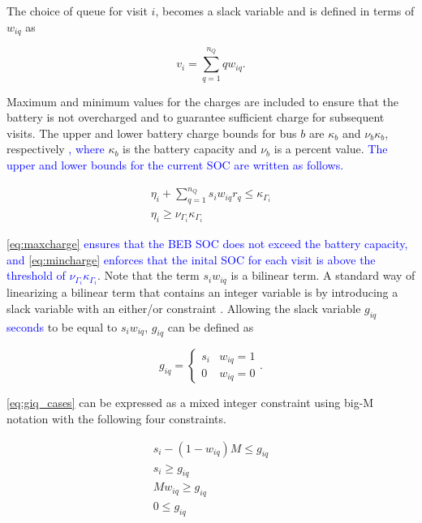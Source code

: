 \documentclass[utf8]{FrontiersinHarvard}
\let\cite\citep                                       %
\begin{document}
The choice of queue for visit \(i\), becomes a slack variable and is defined in terms of \(w_{iq}\) as

\begin{equation}
    v_i = \sum_{q=1}^{n_Q} qw_{iq}.
\end{equation}

Maximum and minimum values for the charges are included to ensure that the battery is not overcharged and to guarantee
sufficient charge for subsequent visits. The upper and lower battery charge bounds for bus \(b\) are \(\kappa_b\) and \(\nu_b \kappa_b\),
respectively \textcolor{blue}{, where} \(\kappa_b\) is the battery capacity and \(\nu_b\) is a percent value. \textcolor{blue}{The upper and lower bounds for the current SOC are written as follows.}

\begin{subequations}
    \label{subeq:pre_min_max}
\begin{align}
    \eta_i + \sum_{q=1}^{n_Q} s_i w_{iq} r_q \leq \kappa_{\Gamma_i} \label{eq:maxcharge}\\
    \eta_i \geq \nu_{\Gamma_i} \kappa_{\Gamma_i} \label{eq:mincharge}
\end{align}
\end{subequations}

\textcolor{blue}{{\autoref{eq:maxcharge}} ensures that the BEB SOC does not exceed the battery capacity, and {\autoref{eq:mincharge}} enforces that the inital SOC for each visit is above the threshold of $\nu_{\Gamma_i}\kappa_{\Gamma_i}$}. Note
that the term \(s_i w_{iq}\) is a bilinear term. A standard way of linearizing a bilinear term that contains an integer
variable is by introducing a slack variable with an either/or constraint
\cite{chen-2010-applied,rodriguez-2013-compar-asses}. Allowing the slack variable \(g_{iq}\)
\textcolor{blue}{seconds} to be equal to \(s_i w_{iq}\), \(g_{iq}\) can be defined as

\begin{equation}
    \label{eq:giq_cases}
    g_{iq} =
    \begin{cases}
        s_i & w_{iq} = 1 \\
        0 & w_{iq} = 0
    \end{cases}.
\end{equation}

\autoref{eq:giq_cases} can be expressed as a mixed integer constraint using big-M notation with the following four
constraints.

\begin{subequations}
    \label{eq:slack_gain}
\begin{align}
    s_i - (1 - w_{iq})M \leq g_{iq}  \label{subeq:repgpgret} \\
    s_i \geq g_{iq}                 \label{subeq:repgples} \\
    Mw_{iq} \geq g_{iq}              \label{subeq:repgwgret} \\
    0 \leq g_{iq}                   \label{subeq:repgwles}
\end{align}
\end{subequations}
\end{document}

